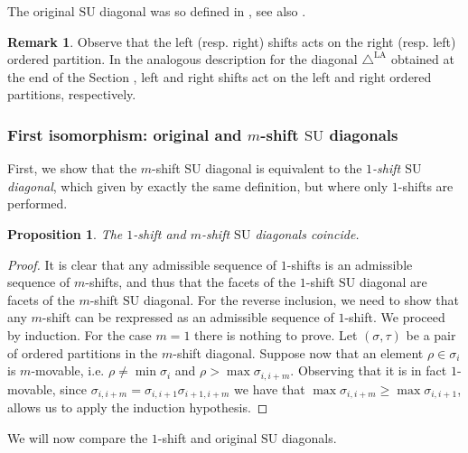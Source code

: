\documentclass{amsart}
\newcommand{\Guillaume}[1]{\todo[color=magenta!30]{\rm #1 \\ \hfill --- G.}}
\newtheorem{proposition}[theorem]{Proposition}
\theoremstyle{definition}
\newtheorem{remark}[theorem]{Remark}
\newcommand{\SU}{\mathrm{SU}}
\newcommand{\LAD}{\triangle^{\mathrm{LA}}}
\begin{document}
The original $\SU$ diagonal was so defined in \cite{SaneblidzeUmble04}, see also \cite{saneblidzeComparingDiagonalsAssociahedra2022}.

\begin{remark}
    Observe that the left (resp. right) shifts acts on the right (resp. left) ordered partition.
    In the analogous description for the diagonal $\LAD$ obtained at the end of the Section \Guillaume{[REF]}, left and right shifts act on the left and right ordered partitions, respectively. 
\end{remark}


\subsubsection{First isomorphism: original and $m$-shift $\SU$ diagonals}

First, we show that the $m$-shift $\SU$ diagonal is equivalent to the \emph{$1$-shift $\SU$ diagonal}, which given by exactly the same definition, but where only $1$-shifts are performed. 

\begin{proposition}
    \label{prop:iso-1-to-m-shift}
    The $1$-shift and $m$-shift $\SU$ diagonals coincide.
\end{proposition}

\begin{proof}
    It is clear that any admissible sequence of $1$-shifts is an admissible sequence of $m$-shifts, and thus that the facets of the $1$-shift $\SU$ diagonal are facets of the $m$-shift $\SU$ diagonal. 
    For the reverse inclusion, we need to show that any $m$-shift can be rexpressed as an admissible sequence of $1$-shift. 
    We proceed by induction.
    For the case $m=1$ there is nothing to prove.
    Let $(\sigma,\tau)$ be a pair of ordered partitions in the $m$-shift diagonal. 
    Suppose now that an element $\rho \in \sigma_i$ is $m$-movable, i.e. $\rho \neq \min \sigma_i$ and $\rho > \max \sigma_{i,i+m}$.
    Observing that it is in fact $1$-movable, since $\sigma_{i,i+m}=\sigma_{i,i+1}\sigma_{i+1,i+m}$ we have that $\max \sigma_{i,i+m}\geq \max \sigma_{i,i+1}$, allows us to apply the induction hypothesis.
\end{proof}

We will now compare the $1$-shift and original $\SU$ diagonals. 
\end{document}
